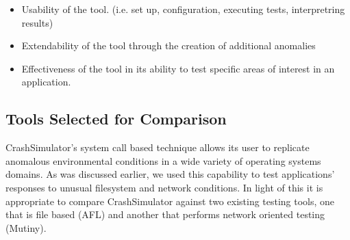 \begin{itemize}

\item Usability of the tool. (i.e. set up, configuration, executing tests,
interpretring results)

\item Extendability of the tool through the creation of additional
anomalies

\item Effectiveness of the tool in its ability to test specific areas of
interest in an application.

\end{itemize}

\subsection{Tools Selected for Comparison}


CrashSimulator's system call based technique allows its user to replicate
anomalous environmental conditions in a wide variety of operating systems
domains.  As was discussed earlier, we used this capability to test
applications' responses to unusual filesystem and network conditions.
In light of this it
is appropriate to compare CrashSimulator against two existing testing
tools, one that is file based (AFL) and another that performs network
oriented testing (Mutiny).

